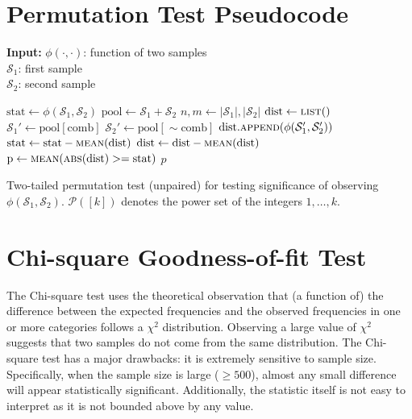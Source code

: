 \documentclass[11pt,a4paper]{article}
\newcommand{\stat}{\phi}
\newcommand{\calS}{\mathcal{S}}
\begin{document}
\section{Permutation Test Pseudocode}\label{app:perm}
\begin{algorithm}[H]
\textbf{Input:} $\stat(\cdot, \cdot)$: function of two samples \\
\hspace*{2.7em} $\calS_1$: first sample \\
\hspace*{2.7em} $\calS_2$: second sample
\begin{algorithmic}[1]
\State $\mathrm{stat} \gets \stat(\calS_1, \calS_2)$
\State $\mathrm{pool} \gets \calS_1 + \calS_2$
\State $n, m \gets |\calS_1|, |\calS_2|$
\State $\mathrm{dist} \gets \textsc{list}()$
    \State $\calS_1' \gets \mathrm{pool}[\mathrm{comb}]$
    \State $\calS_2' \gets \mathrm{pool}[\sim\mathrm{comb}]$
    \State $\mathrm{dist}.\textsc{append}(\stat(\calS_1', \calS_2'))$
\EndFor 
\State $\mathrm{stat} \gets \mathrm{stat}- \textsc{mean}(\mathrm{dist})$ 
\State $\mathrm{dist} \gets \mathrm{dist} - \textsc{mean}(\mathrm{dist})$ 
\State $\mathrm{p}\gets \textsc{mean}(\textsc{abs}(\mathrm{dist})>=\mathrm{stat})$
\State \Return $p$
\end{algorithmic}
\caption{Two-tailed permutation test (unpaired) for testing significance of observing $\stat(\calS_1, \calS_2)$. $ \mathcal P ([k])$ denotes the power set of the integers $1, \dots, k$.}
\label{alg:perm}
\end{algorithm}
\section{Chi-square Goodness-of-fit Test}\label{app:chi_squared}
The Chi-square test uses the theoretical observation that (a function of) the difference between the expected frequencies and the observed frequencies in one or more categories follows a $\chi^2$ distribution. Observing a large value of $\chi^2$ suggests that two samples do not come from the same distribution. 
The Chi-square test has a major drawbacks: it is extremely sensitive to sample size. Specifically, when the sample size is large ($\geq 500$), almost any small difference will appear statistically significant. Additionally, the statistic itself is not easy to interpret as it is not bounded above by any value. 
\end{document}
